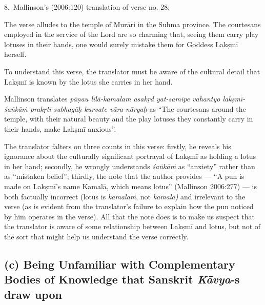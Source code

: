 8.~Mallinson’s (2006:120) translation of verse no. 28: 

The verse alludes to the temple of Murāri in the Suhma province. The courtesans employed in the service of the Lord are so charming that, seeing them carry play lotuses in their hands, one would surely mistake them for Goddess Lakṣmī herself. 

To understand this verse, the translator must be aware of the cultural detail that Lakṣmī is known by the lotus she carries in her hand. 

Mallinson translates \textsl{pāṇau līlā-kamalam asakṛd yat-samīpe vahantyo lakṣmī-śaṅkāṁ prakṛti-subhagāḥ kurvate vāra-nāryaḥ} as “The courtesans around the temple, with their natural beauty and the play lotuses they constantly carry in their hands, make Lakṣmī anxious”. 

The translator falters on three counts in this verse: firstly, he reveals his ignorance about the culturally significant portrayal of Lakṣmī as holding a lotus in her hand; secondly, he wrongly understands \textsl{śaṅkāṁ}  as “anxiety” rather than as “mistaken belief”; thirdly, the note that the author provides --- “A pun is made on Lakṣmī’s name Kamalā, which means lotus” (Mallinson 2006:277) --- is both factually incorrect (lotus is \textsl{kamalaṁ}, not \textsl{kamalā)}  and irrelevant to the verse (as is evident from the translator’s failure to explain how the pun noticed by him operates in the verse). All that the note does is to make us suspect that the translator is aware of some relationship between Lakṣmī and lotus, but not of the sort that might help us understand the verse correctly.

\subsection*{(c) Being Unfamiliar with Complementary Bodies of Knowledge that Sanskrit \textsl{Kāvya}-s draw upon}

